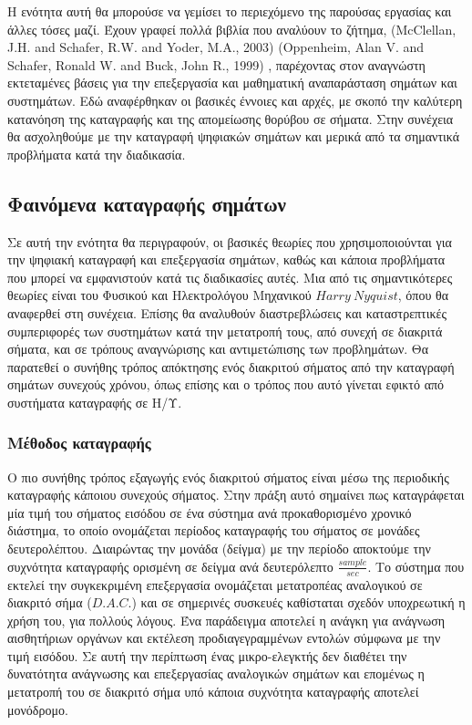\documentclass[breaklines=true, 12pt]{article}
\begin{document}
Η ενότητα αυτή θα μπορούσε να γεμίσει το περιεχόμενο της παρούσας εργασίας
και άλλες τόσες μαζί. Έχουν γραφεί πολλά βιβλία που αναλύουν το ζήτημα,
 (McClellan, J.H. and Schafer, R.W. and Yoder, M.A., 2003) (Oppenheim, Alan V. and Schafer, Ronald W. and Buck, John R., 1999)
,
παρέχοντας στον αναγνώστη εκτεταμένες βάσεις για την επεξεργασία
και μαθηματική αναπαράσταση σημάτων και συστημάτων. Εδώ αναφέρθηκαν οι βασικές
έννοιες και αρχές, με σκοπό την καλύτερη κατανόηση της καταγραφής και της
απομείωσης θορύβου σε σήματα. Στην συνέχεια θα ασχοληθούμε με την καταγραφή
ψηφιακών σημάτων και μερικά από τα σημαντικά προβλήματα κατά την διαδικασία.
\subsection{Φαινόμενα καταγραφής σημάτων}
\label{sec:org66460a9}
    Σε αυτή την ενότητα θα περιγραφούν, οι βασικές θεωρίες που χρησιμοποιούνται
για την ψηφιακή καταγραφή και επεξεργασία σημάτων, καθώς και κάποια προβλήματα
που μπορεί να εμφανιστούν κατά τις διαδικασίες αυτές. Μια από τις σημαντικότερες
θεωρίες είναι του Φυσικού και Ηλεκτρολόγου Μηχανικού \(Harry\ Nyquist\),
όπου θα αναφερθεί στη συνέχεια. Επίσης θα αναλυθούν διαστρεβλώσεις
και καταστρεπτικές συμπεριφορές των συστημάτων κατά την μετατροπή τους, από
συνεχή σε διακριτά σήματα, και σε τρόπους αναγνώρισης και αντιμετώπισης
των προβλημάτων. Θα παρατεθεί ο συνήθης τρόπος απόκτησης ενός διακριτού σήματος
από την καταγραφή σημάτων συνεχούς χρόνου, όπως επίσης και ο τρόπος που αυτό
γίνεται εφικτό από συστήματα καταγραφής σε Η/Υ.
\subsubsection{Μέθοδος καταγραφής}
\label{sec:org2912694}
Ο πιο συνήθης τρόπος εξαγωγής ενός διακριτού σήματος είναι μέσω της περιοδικής
καταγραφής κάποιου συνεχούς σήματος. Στην πράξη αυτό σημαίνει πως καταγράφεται
μία τιμή του σήματος εισόδου σε ένα σύστημα ανά προκαθορισμένο χρονικό διάστημα,
το οποίο ονομάζεται περίοδος καταγραφής του σήματος σε μονάδες δευτερολέπτου.
Διαιρώντας την μονάδα (δείγμα) με την περίοδο αποκτούμε την συχνότητα καταγραφής ορισμένη
σε δείγμα ανά δευτερόλεπτο \(\displaystyle \frac{sample}{sec}\). Το σύστημα που εκτελεί την συγκεκριμένη
επεξεργασία ονομάζεται μετατροπέας αναλογικού σε διακριτό σήμα (\(D.A.C.\))
και σε σημερινές συσκευές καθίσταται σχεδόν υποχρεωτική η χρήση του, για
πολλούς λόγους. Ένα παράδειγμα αποτελεί η ανάγκη για ανάγνωση αισθητήριων
οργάνων και εκτέλεση προδιαγεγραμμένων εντολών σύμφωνα με την τιμή εισόδου.
Σε αυτή την περίπτωση ένας μικρο-ελεγκτής δεν διαθέτει την δυνατότητα
ανάγνωσης και επεξεργασίας αναλογικών σημάτων και επομένως η μετατροπή του
σε διακριτό σήμα υπό κάποια συχνότητα καταγραφής αποτελεί μονόδρομο.
\end{document}
